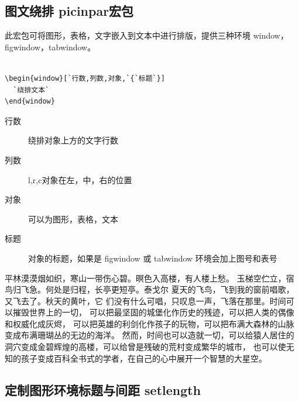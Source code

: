 \clearpage



\subsection{图文绕排 picinpar宏包}
此宏包可将图形，表格，文字嵌入到文本中进行排版，提供三种环境 window，figwindow，tabwindow。


\begin{lstlisting}[language={[LaTeX]TeX}]

\begin{window}[`行数,列数,对象,`{`标题`}]
  `绕排文本`
\end{window}
\end{lstlisting}
\begin{description}
  \item[行数] 绕排对象上方的文字行数
  \item[列数] l,r,c对象在左，中，右的位置
  \item[对象] 可以为图形，表格，文本
  \item[标题] 对象的标题，如果是 figwindow 或 tabwindow 环境会加上图号和表号
\end{description}


\begin{figwindow}
平林漠漠烟如织，寒山一带伤心碧。暝色入高楼，有人楼上愁。
玉梯空伫立，宿鸟归飞急。何处是归程，长亭更短亭。泰戈尔
夏天的飞鸟，飞到我的窗前唱歌，又飞去了。秋天的黄叶，它
们没有什么可唱，只叹息一声，飞落在那里。时间可以摧毁世界上的一切，
可以把最坚固的城堡化作历史的残迹，可以把人类的偶像和权威化成灰烬，
可以把英雄的利剑化作孩子的玩物，可以把布满大森林的山脉变成布满珊瑚丛的无边的海洋。
然而，时间也可以造就一切，可以给猿人居住的洞穴变成金碧辉煌的高楼，可以给曾是残破的荒村变成繁华的城市，
也可以使无知的孩子变成百科全书式的学者，在自己的心中展开一个智慧的大星空。
\end{figwindow}



\subsection{定制图形环境标题与间距 setlength}
